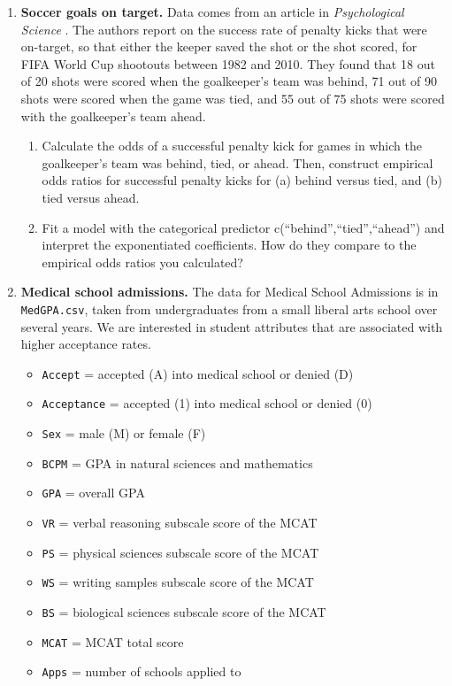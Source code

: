 \documentclass[
]{krantz}
\providecommand{\tightlist}{%
  \setlength{\itemsep}{0pt}\setlength{\parskip}{0pt}}
\begin{document}
\begin{enumerate}
\def\labelenumi{\arabic{enumi}.}
\item
  \textbf{Soccer goals on target.} Data comes from an article in \emph{Psychological Science} \citep{Roskes2011}. The authors report on the success rate of penalty kicks that were on-target, so that either the keeper saved the shot or the shot scored, for FIFA World Cup shootouts between 1982 and 2010. They found that 18 out of 20 shots were scored when the goalkeeper's team was behind, 71 out of 90 shots were scored when the game was tied, and 55 out of 75 shots were scored with the goalkeeper's team ahead.

  \begin{enumerate}
  \def\labelenumii{\alph{enumii}.}
  \item
    Calculate the odds of a successful penalty kick for games in which the goalkeeper's team was behind, tied, or ahead. Then, construct empirical odds ratios for successful penalty kicks for (a) behind versus tied, and (b) tied versus ahead.
  \item
    Fit a model with the categorical predictor c(``behind'',``tied'',``ahead'') and interpret the exponentiated coefficients. How do they compare to the empirical odds ratios you calculated?
  \end{enumerate}
\item
  \textbf{Medical school admissions.} The data for Medical School Admissions is in \texttt{MedGPA.csv}, taken from undergraduates from a small liberal arts school over several years. We are interested in student attributes that are associated with higher acceptance rates.

  \begin{itemize}
  \tightlist
  \item
    \texttt{Accept} = accepted (A) into medical school or denied (D)
  \item
    \texttt{Acceptance} = accepted (1) into medical school or denied (0)
  \item
    \texttt{Sex} = male (M) or female (F)
  \item
    \texttt{BCPM} = GPA in natural sciences and mathematics
  \item
    \texttt{GPA} = overall GPA
  \item
    \texttt{VR} = verbal reasoning subscale score of the MCAT
  \item
    \texttt{PS} = physical sciences subscale score of the MCAT
  \item
    \texttt{WS} = writing samples subscale score of the MCAT
  \item
    \texttt{BS} = biological sciences subscale score of the MCAT
  \item
    \texttt{MCAT} = MCAT total score
  \item
    \texttt{Apps} = number of schools applied to
  \end{itemize}


\end{enumerate}
\end{document}
